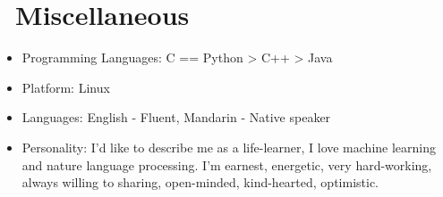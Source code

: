 \documentclass{resume}
\begin{document}
\section{\faCogs\ Miscellaneous}
\begin{itemize}[parsep=0.5ex]
  \item Programming Languages: C == Python > C++ > Java
  \item Platform: Linux
  \item Languages: English - Fluent, Mandarin - Native speaker
  \item Personality: I'd like to describe me as a life-learner, I love machine learning and nature language processing. I'm earnest, energetic, very hard-working, always willing to sharing, open-minded, kind-hearted, optimistic.
\end{itemize}

%
%
\end{document}
